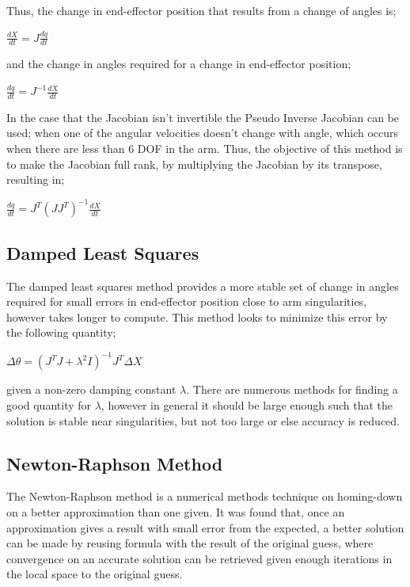 \documentclass[12pt,openany,a4paper]{book}
\begin{document}
Thus, the change in end-effector position that results from a change of angles is;

$\frac{dX}{dt} = J \frac{dq}{dt}$

and the change in angles required for a change in end-effector position;

$\frac{dq}{dt} = J^{-1} \frac{dX}{dt}$

In the case that the Jacobian isn't invertible the Pseudo Inverse Jacobian can be used; when one of the angular velocities doesn't change with angle, which occurs when there are less than 6 DOF in the arm. Thus, the objective of this method is to make the Jacobian full rank, by multiplying the Jacobian by its transpose, resulting in;

$\frac{dq}{dt} = J^T (J J^T)^{-1} \frac{dX}{dt} $

\subsection{Damped Least Squares}
The damped least squares method provides a more stable set of change in angles required for small errors in end-effector position close to arm singularities, however takes longer to compute. This method looks to minimize this error by the following quantity;

$\Delta \theta = (J^T J + \lambda^2 I)^{-1} J^T \Delta X$

given a non-zero damping constant $\lambda$. There are numerous methods for finding a good quantity for $\lambda$, however in general it should be large enough such that the solution is stable near singularities, but not too large or else accuracy is reduced.

\subsection{Newton-Raphson Method}
The Newton-Raphson method is a numerical methods technique on homing-down on a better approximation than one given. It was found that, once an approximation gives a result with small error from the expected, a better solution can be made by reusing formula with the result of the original guess, where convergence on an accurate solution can be retrieved given enough iterations in the local space to the original guess.
\end{document}
